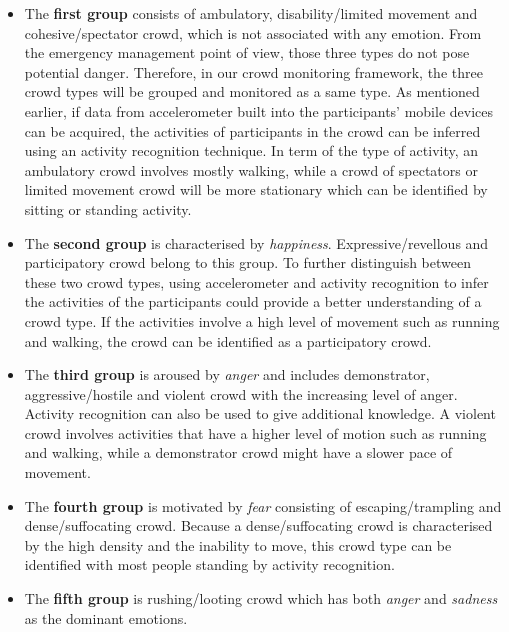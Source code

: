\begin{itemize}
\item The \textbf{first group} consists of ambulatory, disability/limited movement and cohesive/spectator crowd, which is not associated with any emotion. From the emergency management point of view, those three types do not pose potential danger. Therefore, in our crowd monitoring framework, the three crowd types will be grouped and monitored as a same type. As mentioned earlier, if data from accelerometer built into the participants' mobile devices can be acquired, the activities of participants in the crowd can be inferred using an activity recognition technique. In term of the type of activity, an ambulatory crowd involves mostly walking, while a crowd of spectators or limited movement crowd will be more stationary which can be identified by sitting or standing activity.

\item The \textbf{second group} is characterised by \textit{happiness}. Expressive/revellous and participatory crowd belong to this group. To further distinguish between these two crowd types, using accelerometer and activity recognition to infer the activities of the participants could provide a better understanding of a crowd type. If the activities involve a high level of movement such as running and walking, the crowd can be identified as a participatory crowd.

\item The \textbf{third group} is aroused by \textit{anger} and includes demonstrator, aggressive/hostile and violent crowd with the increasing level of anger. Activity recognition can also be used to give additional knowledge. A violent crowd involves activities that have a higher level of motion such as running and walking, while a demonstrator crowd might have a slower pace of movement.

\item The \textbf{fourth group} is motivated by \textit{fear} consisting of escaping/trampling and dense/suffocating crowd. Because a dense/suffocating crowd is characterised by the high density and the inability to move, this crowd type can be identified with most people standing by activity recognition.

\item The \textbf{fifth group} is rushing/looting crowd which has both \textit{anger} and \textit{sadness} as the dominant emotions.
\end{itemize}

